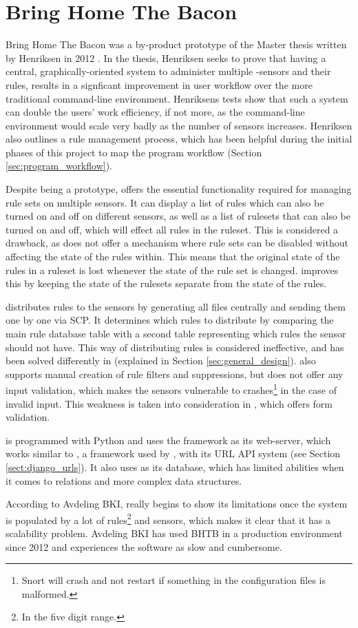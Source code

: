\section{Bring Home The Bacon}
Bring Home The Bacon was a by-product prototype of the Master thesis written by
Henriksen in 2012 \cite{BHTB}. In the thesis, Henriksen seeks to prove that
having a central, graphically-oriented system to administer multiple
\snort{}-sensors and their rules, results in a signficant improvement in user
workflow over the more traditional command-line environment. Henriksens tests
show that such a system can double the users' work efficiency, if not more, as the command-line environment would scale very
badly as the number of sensors increases. Henriksen also outlines a rule
management process, which has been helpful during the initial phases of this
project to map the program workflow (Section \ref{sec:program_workflow}).

Despite being a prototype, \bhtb{} offers the essential functionality required
for managing rule sets on multiple sensors. It can display a list of rules
which can also be turned on and off on different sensors, as well as a list of
rulesets that can also be turned on and off, which will effect all rules in the ruleset. 
This is considered a drawback, as \bhtb{} does not offer
a mechanism where rule sets can be disabled without affecting the state of the
rules within. This means that the original state of the rules in a ruleset
is lost whenever the state of the rule set is changed. \snowman{} improves this
by keeping the state of the rulesets separate from the state of the rules.

\bhtb{} distributes rules to the sensors by generating all files
centrally and sending them one by one via SCP. It determines
which rules to distribute by comparing the main rule database table with a
second table representing which rules the sensor should not have. This way of distributing
rules is considered ineffective, and has been solved differently in \snowman{}
(explained in Section \ref{sec:general_design}). \bhtb{} also supports manual creation of
rule filters and suppressions, but does not offer any input validation, which
makes the sensors vulnerable to crashes\footnote{Snort will crash and not
restart if something in the configuration files is malformed.} in the case of invalid input. This weakness
is taken into consideration in \snowman{}, which offers form
validation. 

\bhtb{} is programmed with Python and uses the \tornado{} framework
\cite{tornado} as its web-server, which works
similar to \django{} \cite{django}, a framework used by \snowman{}, with its URL
API system (see Section \ref{sect:django_urls}). It also uses \sqlite{}
\cite{sqlite} as its database, which has limited abilities when it comes to relations and
more complex data structures.

According to Avdeling BKI, \bhtb{} really begins to show its limitations once the
system is populated by a lot of rules\footnote{In the five digit range.} and
sensors, which makes it clear that it has a scalability problem. Avdeling BKI
has used BHTB in a production environment since 2012 and experiences the
software as slow and cumbersome.


